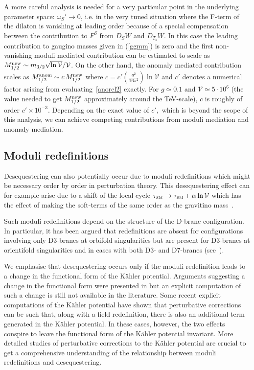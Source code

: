 \documentclass[11pt,a4paper]{article}
\def\SM{{\scriptscriptstyle \rm SM}}
\newcommand\vo{{\mathcal{V}}}
\begin{document}
A more careful analysis is needed for a very particular point in the underlying parameter space:
$\omega_S' \to 0$, i.e. in the very tuned situation where the F-term of the dilaton is vanishing at leading order because of a special compensation between the contribution to $F^S$ from $D_S W$ and $D_{T_b} W$. In this case the leading contribution to gaugino masses given in (\ref{ggmm}) is zero and the first non-vanishing moduli mediated contribution can be estimated to scale as $M_{1/2}^{\rm new}\sim m_{3/2} \sqrt{\ln\vo}/\vo $. On the other hand, the anomaly mediated contribution scales as $M_{1/2}^{\rm anom}\sim c \,M_{1/2}^{\rm new}$ where $c = c' \left(\frac{g^2}{16\pi^2}\right) \ln\vo$ and $c'$ denotes a numerical factor arising from evaluating~\eqref{anorel2} exactly.
For $g\simeq 0.1$ and $\vo \simeq 5\cdot 10^6$ (the value needed to get $M_{1/2}^{\rm new}$ approximately around the TeV-scale), $c$ is roughly of order $c'\times10^{-3}.$ Depending on the exact value of $c',$ which is beyond the scope of this analysis, we can achieve competing contributions from moduli mediation and anomaly mediation.


\subsection{Moduli redefinitions}

Desequestering can also potentially occur due to moduli redefinitions which might be necessary
order by order in perturbation theory. This desequestering effect can for example arise due to a shift of the local cycle $\tau_\SM\rightarrow \tau_\SM+\alpha\ln\vo$ which has the effect of making the soft-terms of the same order as the gravitino mass~\cite{Conlon:2010ji,Choi:2010gm}.

Such moduli redefinitions depend on the structure of the D-brane configuration. In particular, it has been argued that redefinitions are absent for configurations involving only D3-branes at orbifold singularities but are present for D3-branes at orientifold singularities
and in cases with both D3- and D7-branes (see~\cite{Conlon:2010ji}).

We emphasise that desequestering occurs only if the moduli redefinition leads to a change in the functional form of the K\"ahler potential. Arguments suggesting a change in the functional form were presented in \cite{Conlon:2010ji} but an explicit computation of such a change is still not available in the
literature. Some recent explicit computations of the K\"ahler potential \cite{Grimm:2013bha, Junghans:2014zla} have shown that perturbative corrections can be such that, along with a field redefinition, there is also an additional term generated in the K\"ahler potential. In these cases, however,
the two effects conspire to leave the functional form of the K\"ahler potential invariant.
More detailed studies of perturbative corrections to the K\"ahler potential are crucial to get a comprehensive understanding  of the relationship between moduli redefinitions and desequestering.
\end{document}
